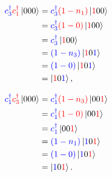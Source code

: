 \begin{equation}
    \begin{aligned}[b]
      \textcolor{blue}{c_3^\dagger}\textcolor{red}{c_1^\dagger}\ket{000} &= \textcolor{blue}{c_3^\dagger}\textcolor{red}{(1-n_1)}\ket{\textcolor{red}{1}00} \\&= \textcolor{blue}{c_3^\dagger}\textcolor{red}{(1-0)}\ket{\textcolor{red}{1}00} \\&=  \textcolor{blue}{c_3^\dagger}\ket{\textcolor{red}{1}00}\\&= \textcolor{blue}{(1-n_3)}\ket{\textcolor{red}{1}0\textcolor{blue}{1}} \\&= \textcolor{blue}{(1-0)}\ket{\textcolor{red}{1}0\textcolor{blue}{1}}\\&=\ket{\textcolor{red}{1}0\textcolor{blue}{1}},\label{wrong1}
    \end{aligned}
\end{equation}

\begin{equation}
    \begin{aligned}[b]
      \textcolor{blue}{c_1^\dagger}\textcolor{red}{c_3^\dagger}\ket{000} &= \textcolor{blue}{c_1^\dagger} \textcolor{red}{(1-n_3)} \ket{00\textcolor{red}{1}} \\&= \textcolor{blue}{c_1^\dagger} \textcolor{red}{(1-0)} \ket{00\textcolor{red}{1}} \\&= \textcolor{blue}{c_1^\dagger} \ket{00\textcolor{red}{1}} \\&= \textcolor{blue}{(1-n_1)} \ket{\textcolor{blue}{1}0\textcolor{red}{1}}\\&= \textcolor{blue}{(1-0)} \ket{\textcolor{blue}{1}0\textcolor{red}{1}}\\&= \ket{\textcolor{blue}{1}0\textcolor{red}{1}}.\label{wrong2}
    \end{aligned}
\end{equation}

